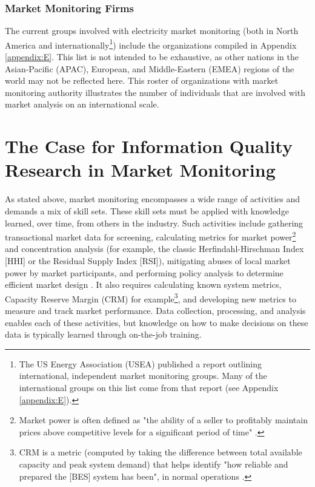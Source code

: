 \subsubsection{Market Monitoring Firms}

The current groups involved with electricity market monitoring (both in North America and internationally\footnote{The US Energy Association (USEA) published a report outlining international, independent market monitoring groups. Many of the international groups on this list come from that report (see Appendix \ref{appendix:E}).}) include the organizations compiled in Appendix \ref{appendix:E}. This list is not intended to be exhaustive, as other nations in the Asian-Pacific (APAC), European, and Middle-Eastern (EMEA) regions of the world may not be reflected here. This roster of organizations with market monitoring authority illustrates the number of individuals that are involved with market analysis on an international scale. 

\section{The Case for Information Quality Research in Market Monitoring}

As stated above, market monitoring encompasses a wide range of activities and demands a mix of skill sets. These skill sets must be applied with knowledge learned, over time, from others in the industry. Such activities include gathering transactional market data for screening, calculating metrics for market power\footnote{Market power is often defined as "the ability of a seller to profitably maintain prices above competitive levels for a significant period of time" \cite{rahimi-sheffrin}.}
and concentration analysis (for example, the classic Herfindahl-Hirschman Index [HHI] or the Residual Supply Index [RSI]), mitigating abuses of local market power by market participants, and performing policy analysis to determine efficient market design \cite{goldman} \cite{gao-bompard-napoli-zhou}. 
It also requires calculating known system metrics, Capacity Reserve Margin (CRM) for example\footnote{CRM is a metric (computed by taking the difference between total available capacity and peak system demand) that helps identify "how reliable and prepared the [BES] system has been", in normal operations \cite{jyang}.}, and developing new metrics to measure and track market performance. Data collection, processing, and analysis enables each of these activities, but knowledge on how to make decisions on these data is typically learned through on-the-job training. 

